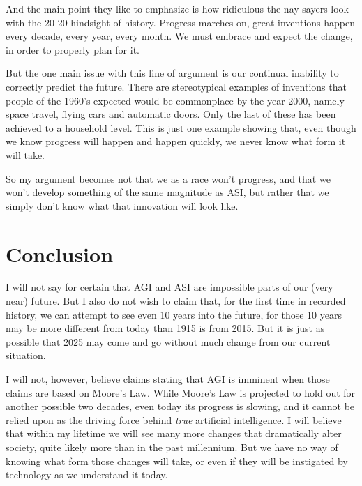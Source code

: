 \documentclass[12pt]{article} %
\begin{document}
And the main point they like to emphasize is how ridiculous the nay-sayers look with the 20-20 hindsight of history. Progress marches on, great inventions happen every decade, every year, every month. We must embrace and expect the change, in order to properly plan for it.

But the one main issue with this line of argument is our continual inability to correctly predict the future. There are stereotypical examples of inventions that people of the 1960's expected would be commonplace by the year 2000, namely space travel, flying cars and automatic doors. Only the last of these has been achieved to a household level. This is just one example showing that, even though we know progress will happen and happen quickly, we never know what form it will take.

So my argument becomes not that we as a race won't progress, and that we won't develop something of the same magnitude as ASI, but rather that we simply don't know what that innovation will look like. 


\section{Conclusion} %

I will not say for certain that AGI and ASI are impossible parts of our (very near) future. But I also do not wish to claim that, for the first time in recorded history, we can attempt to see even 10 years into the future, for those 10 years may be more different from today than 1915 is from 2015. But it is just as possible that 2025 may come and go without much change from our current situation.

I will not, however, believe claims stating that AGI is imminent when those claims are based on Moore's Law. While Moore's Law is projected to hold out for another possible two decades, even today its progress is slowing, and it cannot be relied upon as the driving force behind \textit{true} artificial intelligence. I will believe that within my lifetime we will see many more changes that dramatically alter society, quite likely more than in the past millennium. But we have no way of knowing what form those changes will take, or even if they will be instigated by technology as we understand it today.
\end{document}
